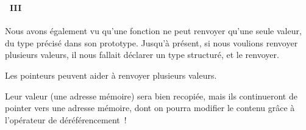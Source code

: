 \begin{frame}%
  \frametitle{\secname}
  \framesubtitle{\subsecname~III}

  Nous avons également vu qu'une fonction ne peut renvoyer qu'une seule valeur, du type précisé dans son prototype. Jusqu'à présent, 
  si nous voulions renvoyer plusieurs valeurs, il nous fallait déclarer un type structuré, et le renvoyer.
  \vspace{0.5cm}
  \par
  Les pointeurs peuvent aider à renvoyer plusieurs valeurs.
  \vspace{0.3cm}
  \par
  Leur valeur (une adresse mémoire) sera bien recopiée, mais ils continueront de pointer vers une adresse mémoire, dont on pourra modifier
  le contenu grâce à l'opérateur de déréférencement~!
\end{frame}

